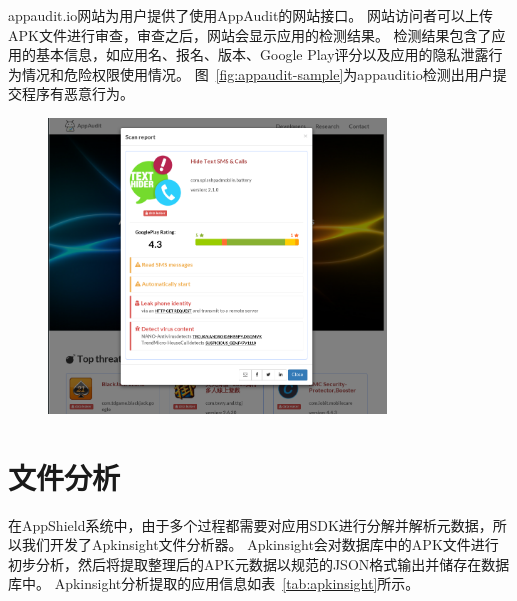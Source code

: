 appaudit.io网站为用户提供了使用AppAudit的网站接口。
网站访问者可以上传APK文件进行审查，审查之后，网站会显示应用的检测结果。
检测结果包含了应用的基本信息，如应用名、报名、版本、Google Play评分以及应用的隐私泄露行为情况和危险权限使用情况。
图~\ref{fig:appaudit-sample}为appauditio检测出用户提交程序有恶意行为。

\begin{figure}
	\centering
	\includegraphics[width=0.8\textwidth]{figure/appaudit-sample.png}
\end{figure}

\section{文件分析}
\label{sec:appshield:file-analyze}

在AppShield系统中，由于多个过程都需要对应用SDK进行分解并解析元数据，所以我们开发了Apkinsight文件分析器。
Apkinsight会对数据库中的APK文件进行初步分析，然后将提取整理后的APK元数据以规范的JSON格式输出并储存在数据库中。
Apkinsight分析提取的应用信息如表~\ref{tab:apkinsight}所示。



